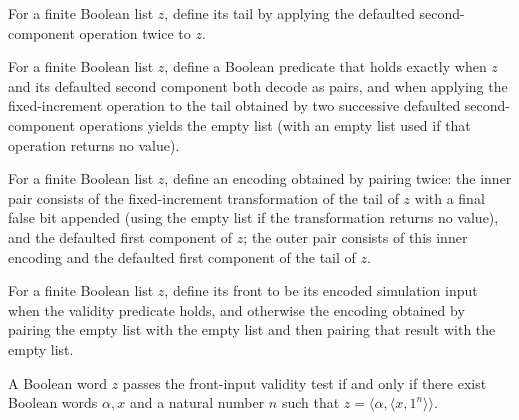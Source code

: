 \begin{definition}
\label{Complexity.expcom_tail}
\leanok
{}
For a finite Boolean list $z$, define its tail by applying the defaulted
second-component operation twice to $z$.
\end{definition}

\begin{definition}
\label{Complexity.expcom_ok}
\leanok
{}
For a finite Boolean list $z$, define a Boolean predicate that holds exactly when $z$
and its defaulted second component both decode as pairs, and when applying the
fixed-increment operation to the tail obtained by two successive defaulted
second-component operations yields the empty list (with an empty list used if that
operation returns no value).
\end{definition}

\begin{definition}
\label{Complexity.expcom_simIn}
\leanok
{}
For a finite Boolean list $z$, define an encoding obtained by pairing twice: the inner
pair consists of the fixed-increment transformation of the tail of $z$ with a final
false bit appended (using the empty list if the transformation returns no value), and
the defaulted first component of $z$; the outer pair consists of this inner encoding and
the defaulted first component of the tail of $z$.
\end{definition}

\begin{definition}
\label{Complexity.expcom_front}
\leanok
{}
For a finite Boolean list $z$, define its front to be its encoded simulation input when
the validity predicate holds, and otherwise the encoding obtained by pairing the empty
list with the empty list and then pairing that result with the empty list.
\end{definition}

\begin{lemma}
\label{Complexity.expcom_ok_iff}
\leanok
{}
A Boolean word $z$ passes the front-input validity test if and only if there exist
Boolean words $\alpha,x$ and a natural number $n$ such that $z=\langle\alpha,\langle
x,1^n\rangle\rangle$.
\end{lemma}

